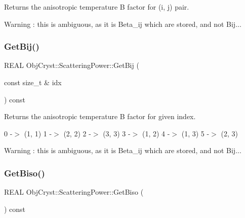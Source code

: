 Returns the anisotropic temperature B factor for (i, j) pair. 

\begin{DoxyWarning}{Warning}
\+: this is ambiguous, as it is Beta\+\_\+ij which are stored, and not Bij... 
\end{DoxyWarning}
\mbox{\label{class_obj_cryst_1_1_scattering_power_a781089695f7e8595313b5a0acfba65c1}} 
\subsubsection{\texorpdfstring{GetBij()}{GetBij()}\hspace{0.1cm}{\footnotesize\ttfamily [2/2]}}
{\footnotesize\ttfamily R\+E\+AL Obj\+Cryst\+::\+Scattering\+Power\+::\+Get\+Bij (\begin{DoxyParamCaption}\item[{const size\+\_\+t \&}]{idx }\end{DoxyParamCaption}) const}



Returns the anisotropic temperature B factor for given index. 

0 -\/$>$ (1, 1) 1 -\/$>$ (2, 2) 2 -\/$>$ (3, 3) 3 -\/$>$ (1, 2) 4 -\/$>$ (1, 3) 5 -\/$>$ (2, 3)

\begin{DoxyWarning}{Warning}
\+: this is ambiguous, as it is Beta\+\_\+ij which are stored, and not Bij... 
\end{DoxyWarning}
\mbox{\label{class_obj_cryst_1_1_scattering_power_a410cbc9c760375aff093a901fd8ad0dd}} 
\subsubsection{\texorpdfstring{GetBiso()}{GetBiso()}\hspace{0.1cm}{\footnotesize\ttfamily [1/2]}}
{\footnotesize\ttfamily R\+E\+AL Obj\+Cryst\+::\+Scattering\+Power\+::\+Get\+Biso (\begin{DoxyParamCaption}{ }\end{DoxyParamCaption}) const}



